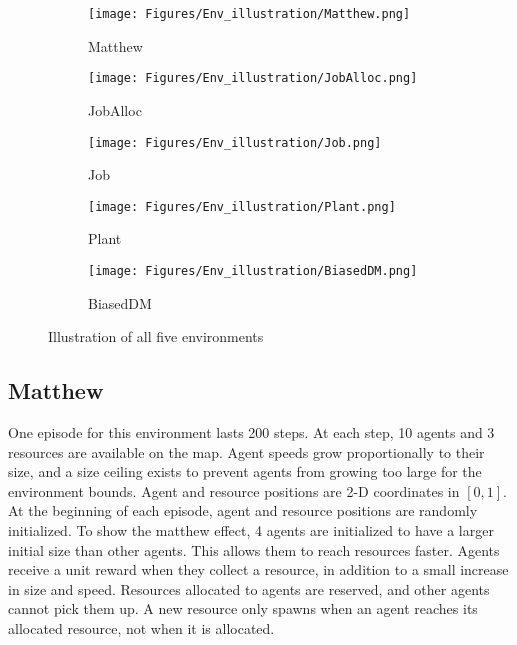 \begin{figure*}[t]
    \centering
    \begin{subfigure}[b]{0.19\linewidth}
        \centering
        \texttt{[image: Figures/Env\_illustration/Matthew.png]}
        \caption*{Matthew}
    \end{subfigure}
    \begin{subfigure}[b]{0.19\linewidth}
        \centering
        \texttt{[image: Figures/Env\_illustration/JobAlloc.png]}
        \caption*{JobAlloc}
    \end{subfigure}
    \begin{subfigure}[b]{0.19\linewidth}
        \centering
        \texttt{[image: Figures/Env\_illustration/Job.png]}
        \caption*{Job}
    \end{subfigure}
    \begin{subfigure}[b]{0.19\linewidth}
        \centering
        \texttt{[image: Figures/Env\_illustration/Plant.png]}
        \caption*{Plant}
    \end{subfigure}
    \begin{subfigure}[b]{0.19\linewidth}
        \centering
        \texttt{[image: Figures/Env\_illustration/BiasedDM.png]}
        \caption*{BiasedDM}
    \end{subfigure}
    \caption{Illustration of all five environments}
    \label{fig:env_illustration}
\end{figure*}

\subsection{Matthew}
One episode for this environment lasts 200 steps. At each step, 10 agents and 3 resources are available on the map. Agent speeds grow proportionally to their size, and a size ceiling exists to prevent agents from growing too large for the environment bounds. Agent and resource positions are 2-D coordinates in $[0,1]$. At the beginning of each episode, agent and resource positions are randomly initialized.
To show the matthew effect, 4 agents are initialized to have a larger initial size than other agents. This allows them to reach resources faster. Agents receive a unit reward when they collect a resource, in addition to a small increase in size and speed. Resources allocated to agents are reserved, and other agents cannot pick them up. A new resource only spawns when an agent reaches its allocated resource, not when it is allocated.

